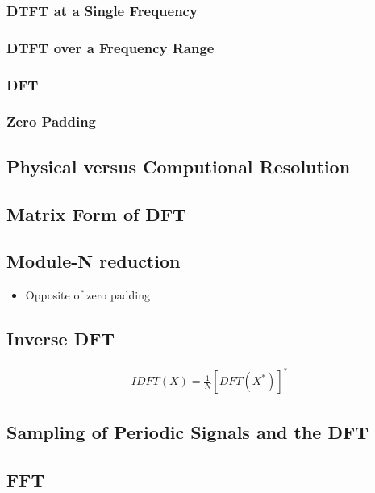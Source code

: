 \subsubsection{DTFT at a Single Frequency}
\subsubsection{DTFT over a Frequency Range}
\subsubsection{DFT}
\subsubsection{Zero Padding}

\subsection{Physical versus Computional Resolution}

\subsection{Matrix Form of DFT}

\subsection{Module-N reduction}
\begin{itemize}
	\item Opposite of zero padding
\end{itemize}


\subsection{Inverse DFT}
\begin{align*}
	IDFT(X) = \frac{1}{N}\left[DFT(X^*)\right]^*
	\label{eq:IDFT}
\end{align*}

\subsection{Sampling of Periodic Signals and the DFT}

\subsection{FFT}

